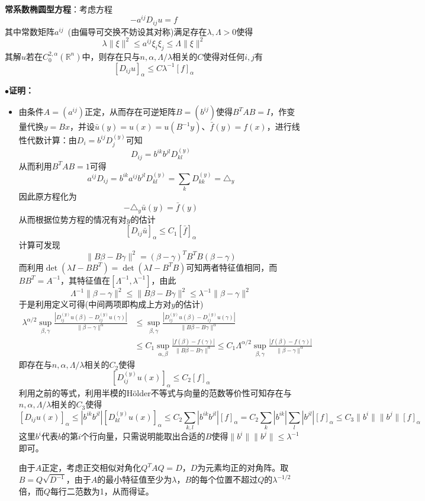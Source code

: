 \documentclass[a4paper,UTF8,fontset=windows,AutoFakeBold]{ctexart}
\newcommand{\proo}[1]{{\kaishu $\bullet$\textbf{证明：}
\begin{itemize}
    \item[] #1
\end{itemize}
}}
\begin{document}
\

\textbf{常系数椭圆型方程}：考虑方程
$$-a^{ij}D_{ij}u=f$$
其中常数矩阵$a^{ij}$\ (由偏导可交换不妨设其对称)满足存在$\lambda,\Lambda>0$使得
$$\lambda\|\xi\|^2\le a^{ij}\xi_i\xi_j\le\Lambda\|\xi\|^2$$
其解$u$若在$C_0^{2,\alpha}(\mathbb{R}^n)$中，则存在只与$n,\alpha,\Lambda/\lambda$相关的$C$使得对任何$i,j$有
$$[D_{ij}u]_\alpha\le C\lambda^{-1}[f]_\alpha$$
\proo{
    由条件$A=(a^{ij})$正定，从而存在可逆矩阵$B=(b^{ij})$使得$B^TAB=I$，作变量代换$y=Bx$，并设$\bar{u}(y)=u(x)=u(B^{-1}y)$、$\bar{f}(y)=f(x)$，进行线性代数计算：由$D_i=b^{ij}D_j^{(y)}$可知
    $$D_{ij}=b^{ik}b^{jl}D_{kl}^{(y)}$$
    从而利用$B^TAB=1$可得
    $$a^{ij}D_{ij}=b^{ik}a^{ij}b^{jl}D_{kl}^{(y)}=\sum_kD_{kk}^{(y)}=\triangle_y$$
    因此原方程化为
    $$-\triangle_y\bar{u}(y)=\bar{f}(y)$$
    从而根据位势方程的情况有对$y$的估计
    $$[D_{ij}\bar{u}]_\alpha\le C_1[\bar{f}]_\alpha$$
    计算可发现
    $$\|B\beta-B\gamma\|^2=(\beta-\gamma)^TB^TB(\beta-\gamma)$$
    而利用$\det(\lambda I-BB^T)=\det(\lambda I-B^TB)$可知两者特征值相同，而$BB^T=A^{-1}$，其特征值在$[\Lambda^{-1},\lambda^{-1}]$，由此
    $$\Lambda^{-1}\|\beta-\gamma\|^2\le\|B\beta-B\gamma\|^2\le\lambda^{-1}\|\beta-\gamma\|^2$$
    于是利用定义可得(中间两项即构成上方对$y$的估计)
    $$\begin{aligned}\lambda^{\alpha/2}\sup_{\beta,\gamma}\frac{|D_{ij}^{(y)}u(\beta)-D_{ij}^{(y)}u(\gamma)|}{\|\beta-\gamma\|^\alpha}&\le\sup_{\beta,\gamma}\frac{|D_{ij}^{(y)}u(\beta)-D_{ij}^{(y)}u(\gamma)|}{\|B\beta-B\gamma\|^\alpha}\\ &\le C_1\sup_{\alpha,\beta}\frac{|f(\beta)-f(\gamma)|}{\|B\beta-B\gamma\|^\alpha}\le C_1\Lambda^{\alpha/2}\sup_{\beta,\gamma}\frac{|f(\beta)-f(\gamma)|}{\|\beta-\gamma\|^\alpha}\end{aligned}$$
    即存在与$n,\alpha,\Lambda/\lambda$相关的$C_2$使得
    $$[D_{ij}^{(y)}u(x)]_\alpha\le C_2[f]_\alpha$$
    利用之前的等式，利用半模的H\"older不等式与向量的范数等价性可知存在与$n,\alpha,\Lambda/\lambda$相关的$C_3$使得
    $$[D_{ij}u(x)]_\alpha\le|b^{ik}b^{jl}|[D_{kl}^{(y)}u(x)]_\alpha\le C_2\sum_{k,l}|b^{ik}b^{jl}|[f]_\alpha=C_2\sum_k|b^{ik}|\sum_l|b^{jl}|[f]_\alpha\le C_3\|b^i\|\|b^j\|[f]_\alpha$$
    这里$b^i$代表$b$的第$i$个行向量，只需说明能取出合适的$B$使得$\|b^i\|\|b^j\|\le\lambda^{-1}$即可。

    由于$A$正定，考虑正交相似对角化$Q^TAQ=D$，$D$为元素均正的对角阵。取$B=Q\sqrt{D^{-1}}$，由于$A$的最小特征值至少为$\lambda$，$B$的每个位置不超过$Q$的$\lambda^{-1/2}$倍，而$Q$每行二范数为1，从而得证。

}
\end{document}

